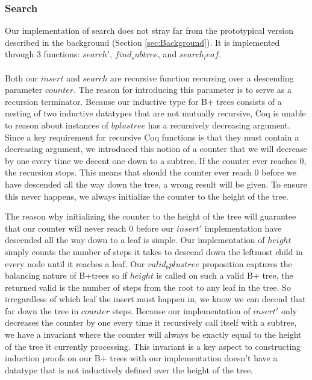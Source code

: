 \paragraph{}

\subsubsection{Search}
Our implementation of search does not stray far from the prototypical version described in the background (Section \ref{sec:Background}). It is implemented through 3 functions: $search'$, $find_subtree$, and $search_leaf$. 

\paragraph{}
Both our $insert$ and $search$ are recursive function recursing over a descending parameter $counter$. The reason for introducing this parameter is to serve as a recursion terminator. Because our inductive type for B+ trees consists of a nesting of two inductive datatypes that are not mutually recursive, Coq is unable to reason about instances of $bplustree$ has a recursively decreasing argument. Since a key requirement for recursive Coq functions is that they must contain a decreasing argument, we introduced this notion of a counter that we will decrease by one every time we decent one down to a subtree. If the counter ever reaches $0$, the recursion stops. This means that should the counter ever reach $0$ before we have descended all the way down the tree, a wrong result will be given. To ensure this never happens, we always initialize the counter to the height of the tree.

The reason why initializing the counter to the height of the tree will guarantee that our counter will never reach $0$ before our $insert'$ implementation have descended all the way down to a leaf is simple. Our implementation of $height$ simply counts the number of steps it takes to descend down the leftmost child in every node until it reaches a leaf. Our $valid_bplustree$ proposition captures the balancing nature of B+trees so if $height$ is called on such a valid B+ tree, the returned valid is the number of steps from the root to any leaf in the tree. So irregardless of which leaf the insert must happen in, we know we can decend that far down the tree in $counter$ steps. Because our implementation of $insert'$ only decreases the counter by one every time it recursively call itself with a subtree, we have a invariant where the counter will always be exactly equal to the height of the tree it currently processing. This invariant is a key aspect to constructing induction proofs on our B+ trees with our implementation doesn't have a datatype that is not inductively defined over the height of the tree.

